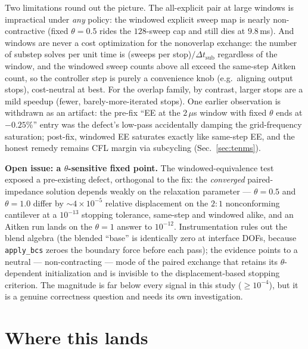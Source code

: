 \documentclass[11pt]{article}
\newcommand{\code}[1]{\texttt{#1}}
\begin{document}
Two limitations round out the picture. The all-explicit pair at large
windows is impractical under \emph{any} policy: the windowed explicit
sweep map is nearly non-contractive (fixed $\theta = 0.5$ rides the
$128$-sweep cap and still dies at $9.8$\,ms). And windows are never a
cost optimization for the nonoverlap exchange: the number of substep
solves per unit time is (sweeps per stop)$/\Delta t_{\mathrm{sub}}$
regardless of the window, and the windowed sweep counts above all exceed
the same-step Aitken count, so the controller step is purely a
convenience knob (e.g.\ aligning output stops), cost-neutral at best.
For the overlap family, by contrast, larger stops are a mild speedup
(fewer, barely-more-iterated stops). One earlier observation is
withdrawn as an artifact: the pre-fix ``EE at the $2\,\mu$s window with
fixed $\theta$ ends at $-0.25\%$'' entry was the defect's low-pass
accidentally damping the grid-frequency saturation; post-fix, windowed
EE saturates exactly like same-step EE, and the honest remedy remains
CFL margin via subcycling (Sec.~\ref{sec:tenms}).

\textbf{Open issue: a $\theta$-sensitive fixed point.} The
windowed-equivalence test exposed a pre-existing defect, orthogonal to
the fix: the \emph{converged} paired-impedance solution depends weakly on
the relaxation parameter --- $\theta = 0.5$ and $\theta = 1.0$ differ by
${\sim}4\times 10^{-5}$ relative displacement on the $2{:}1$
nonconforming cantilever at a $10^{-13}$ stopping tolerance, same-step
and windowed alike, and an Aitken run lands on the $\theta = 1$ answer to
$10^{-12}$. Instrumentation rules out the blend algebra (the blended
``base'' is identically zero at interface DOFs, because
\code{apply\_bcs} zeroes the boundary force before each pass); the
evidence points to a neutral --- non-contracting --- mode of the paired
exchange that retains its $\theta$-dependent initialization and is
invisible to the displacement-based stopping criterion. The magnitude is
far below every signal in this study ($\ge 10^{-4}$), but it is a genuine
correctness question and needs its own investigation.

\section{Where this lands}
\label{sec:conclusion}
\end{document}
